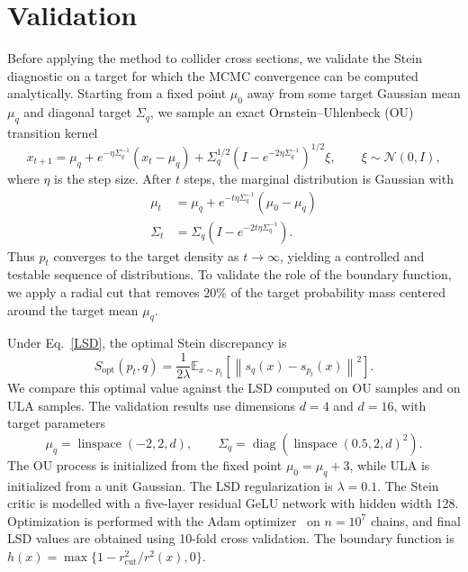 \documentclass[11pt]{article}
\begin{document}
\section{Validation}
Before applying the method to collider cross sections, we validate the Stein diagnostic on a target for which the MCMC convergence can be computed analytically.
Starting from a fixed point $\mu_0$ away from some target Gaussian mean $\mu_q$ and diagonal target $\Sigma_q$, we sample an exact Ornstein--Uhlenbeck (OU) transition kernel
\begin{equation}
  x_{t+1} = \mu_q + e^{-\eta \Sigma_q^{-1}}(x_t-\mu_q) + \Sigma_q^{1/2} \left(I-e^{-2\eta\Sigma_q^{-1}}\right)^{1/2}\xi, \qquad \xi\sim\mathcal{N}(0,I),
\end{equation}
where $\eta$ is the step size.
After $t$ steps, the marginal distribution is Gaussian with
\begin{align}
  \mu_t &= \mu_q + e^{-t\eta\Sigma_q^{-1}}(\mu_0-\mu_q) \nonumber \\
  \Sigma_t &= \Sigma_q\left(I-e^{-2t\eta\Sigma_q^{-1}}\right).
\end{align}
Thus $p_t$ converges to the target density as $t\to\infty$, yielding a controlled and testable sequence of distributions.
To validate the role of the boundary function, we apply a radial cut that removes $20\%$ of the target probability mass centered around the target mean $\mu_q$.

Under Eq.~\eqref{LSD}, the optimal Stein discrepancy is~\cite{hu2018stein}
\begin{equation}
  S_{\mathrm{opt}}(p_t,q) = \frac{1}{2\lambda} \mathbb{E}_{x\sim p_t} \left[ \left\lVert s_q(x)-s_{p_t}(x) \right\rVert^2 \right].
\end{equation}
We compare this optimal value against the LSD computed on OU samples and on ULA samples. 
The validation results use dimensions $d=4$ and $d=16$, with target parameters
\begin{equation}
  \mu_q = \operatorname{linspace}(-2,2,d),
  \qquad
  \Sigma_q = \operatorname{diag}\!\left(\operatorname{linspace}(0.5,2,d)^2\right).
\end{equation}
The OU process is initialized from the fixed point $\mu_0=\mu_q+3$, while ULA is initialized from a unit Gaussian.
The LSD regularization is $\lambda=0.1$.
The Stein critic is modelled with a five-layer residual GeLU network with hidden width 128.
Optimization is performed with the Adam optimizer~\cite{kingma2014adam} on $n=10^7$ chains, and final LSD values are obtained using 10-fold cross validation.
The boundary function is $h(x) = \max\{1-r_{\mathrm{cut}}^2 / r^2(x),0\}$.
\end{document}
